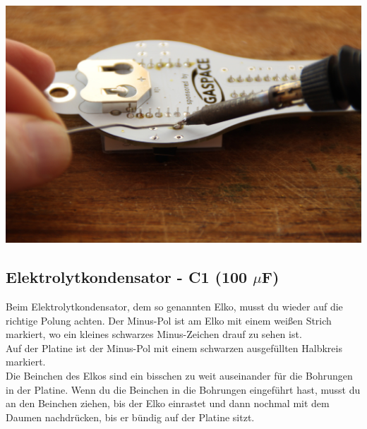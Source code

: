 \documentclass{article}
\begin{document}
\begin{minipage}[b]{0.5\textwidth}
	\includegraphics[width=\textwidth]{Bilder2023/IMG_8381.JPG}
\end{minipage}

\subsection{Elektrolytkondensator - C1 (100 $\mu$F)}

Beim Elektrolytkondensator, dem so genannten Elko, musst du wieder auf die richtige Polung achten. Der Minus-Pol ist am Elko mit einem weißen Strich markiert, wo ein kleines schwarzes Minus-Zeichen drauf zu sehen ist.\\

Auf der Platine ist der Minus-Pol mit einem schwarzen ausgefüllten Halbkreis markiert.\\

Die Beinchen des Elkos sind ein bisschen zu weit auseinander für die Bohrungen in der Platine. Wenn du die Beinchen in die Bohrungen eingeführt hast, musst du an den Beinchen ziehen, bis der Elko einrastet und dann nochmal mit dem Daumen nachdrücken, bis er bündig auf der Platine sitzt.

\vspace{1cm}
\end{document}
